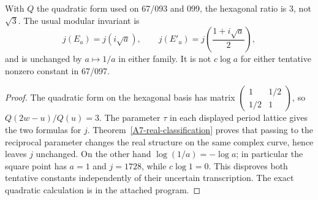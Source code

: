 \begin{corollary}\label{A7-ratio-j}
With $Q$ the quadratic form used on 67/093 and 099, the hexagonal ratio is $3$, not $\sqrt3$. The usual modular invariant is
\[
 j(E_a)=j(i\sqrt a),\qquad
 j(E'_a)=j\left(\frac{1+i\sqrt a}{2}\right),
\]
and is unchanged by $a\mapsto1/a$ in either family. It is not $c\log a$ for either tentative nonzero constant in 67/097.
\end{corollary}
\begin{proof}
The quadratic form on the hexagonal basis has matrix
$\left(\begin{smallmatrix}1&1/2\\1/2&1\end{smallmatrix}\right)$, so $Q(2w-u)/Q(u)=3$. The parameter $\tau$ in each displayed period lattice gives the two formulas for $j$. Theorem~\ref{A7-real-classification} proves that passing to the reciprocal parameter changes the real structure on the same complex curve, hence leaves $j$ unchanged. On the other hand $\log(1/a)=-\log a$; in particular the square point has $a=1$ and $j=1728$, while $c\log1=0$. This disproves both tentative constants independently of their uncertain transcription. The exact quadratic calculation is in the attached program.
\end{proof}

